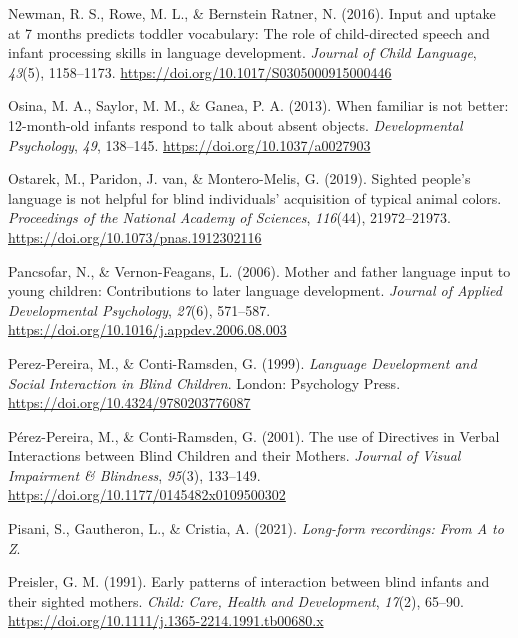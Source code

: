 \documentclass[
  man,floatsintext]{apa6}
\newlength{\cslhangindent}
\newlength{\cslentryspacingunit} %
\newenvironment{CSLReferences}[2] %
 {%
  \setlength{\parindent}{0pt}
  \ifodd #1
  \let\oldpar\par
  \def\par{\hangindent=\cslhangindent\oldpar}
  \fi
  \setlength{\parskip}{#2\cslentryspacingunit}
 }%
 {}
\begin{document}
\begin{CSLReferences}{1}{0}
\leavevmode{}%
Newman, R. S., Rowe, M. L., \& Bernstein Ratner, N. (2016). Input and uptake at 7 months predicts toddler vocabulary: The role of child-directed speech and infant processing skills in language development. \emph{Journal of Child Language}, \emph{43}(5), 1158--1173. \url{https://doi.org/10.1017/S0305000915000446}

\leavevmode{}%
Osina, M. A., Saylor, M. M., \& Ganea, P. A. (2013). When familiar is not better: 12-month-old infants respond to talk about absent objects. \emph{Developmental Psychology}, \emph{49}, 138--145. \url{https://doi.org/10.1037/a0027903}

\leavevmode{}%
Ostarek, M., Paridon, J. van, \& Montero-Melis, G. (2019). Sighted people's language is not helpful for blind individuals' acquisition of typical animal colors. \emph{Proceedings of the National Academy of Sciences}, \emph{116}(44), 21972--21973. \url{https://doi.org/10.1073/pnas.1912302116}

\leavevmode{}%
Pancsofar, N., \& Vernon-Feagans, L. (2006). Mother and father language input to young children: {Contributions} to later language development. \emph{Journal of Applied Developmental Psychology}, \emph{27}(6), 571--587. \url{https://doi.org/10.1016/j.appdev.2006.08.003}

\leavevmode{}%
Perez-Pereira, M., \& Conti-Ramsden, G. (1999). \emph{Language {Development} and {Social Interaction} in {Blind Children}}. {London}: {Psychology Press}. \url{https://doi.org/10.4324/9780203776087}

\leavevmode{}%
Pérez-Pereira, M., \& Conti-Ramsden, G. (2001). The use of {Directives} in {Verbal Interactions} between {Blind Children} and their {Mothers}. \emph{Journal of Visual Impairment \& Blindness}, \emph{95}(3), 133--149. \url{https://doi.org/10.1177/0145482x0109500302}

\leavevmode{}%
Pisani, S., Gautheron, L., \& Cristia, A. (2021). \emph{Long-form recordings: {From A} to {Z}}.

\leavevmode{}%
Preisler, G. M. (1991). Early patterns of interaction between blind infants and their sighted mothers. \emph{Child: Care, Health and Development}, \emph{17}(2), 65--90. \url{https://doi.org/10.1111/j.1365-2214.1991.tb00680.x}


\end{CSLReferences}
\end{document}
